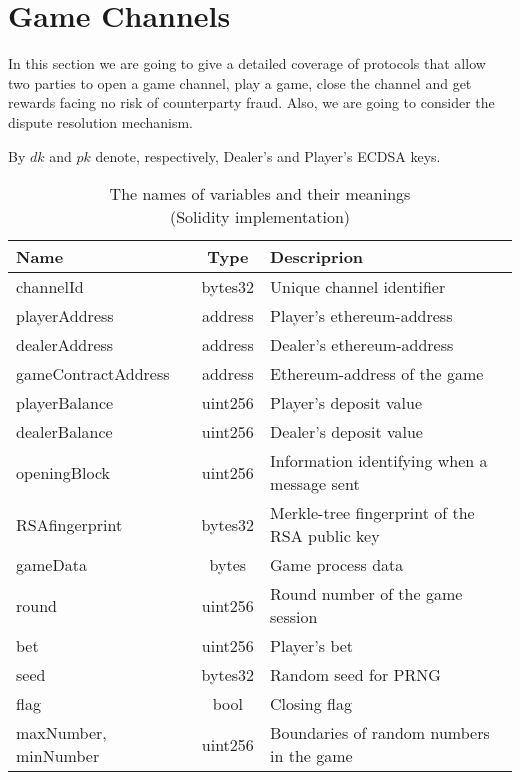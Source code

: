 \section{Game Channels} \label{gamechannel}
In this section we are going to give a detailed coverage of protocols that allow two parties to open a game channel, play a game, close the channel and get rewards facing no risk of counterparty fraud. Also, we are going to consider the dispute resolution mechanism.

By $dk$ and $pk$ denote, respectively, Dealer's and Player's ECDSA keys. 

\begin{table}[h]

\caption{The names of variables and their meanings \\ (Solidity implementation)}
\begin{tabular}{|l|c|l|}
\hline
Name&Type&Descriprion\\
\hline
channelId & bytes32 & Unique channel identifier\\ 

playerAddress & address & Player's ethereum-address\\            
dealerAddress & address & Dealer's ethereum-address\\  
gameContractAddress & address & Ethereum-address of the game\\             
playerBalance & uint256 & Player's deposit value\\                   
dealerBalance & uint256 & Dealer's deposit value\\                   
openingBlock & uint256 &  Information identifying when a message sent\\                  
RSAfingerprint & bytes32 &  Merkle-tree fingerprint of the RSA public key\\  
gameData & bytes & Game process data\\
round & uint256 & Round number of the game session \\
bet & uint256 & Player's bet \\
seed & bytes32 & Random seed for PRNG\\
flag & bool &Closing flag \\
maxNumber, minNumber & uint256 & Boundaries of random numbers in the game\\
\hline
\end{tabular}
\end{table}

